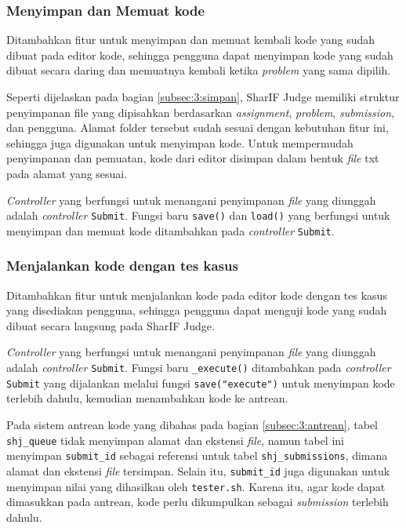 \subsubsection{Menyimpan dan Memuat kode}
Ditambahkan fitur untuk menyimpan dan memuat kembali kode yang sudah dibuat pada editor kode, sehingga pengguna dapat menyimpan kode yang sudah dibuat secara daring dan memuatnya kembali ketika \textit{problem} yang sama dipilih. 

Seperti dijelaskan pada bagian \ref{subsec:3:simpan}, SharIF Judge memiliki struktur penyimpanan file yang dipisahkan berdasarkan \textit{assignment}, \textit{problem}, \textit{submission}, dan pengguna. Alamat folder tersebut sudah sesuai dengan kebutuhan fitur ini, sehingga juga digunakan untuk menyimpan kode. Untuk mempermudah penyimpanan dan pemuatan, kode dari editor disimpan dalam bentuk \textit{file} txt pada alamat yang sesuai. 

\textit{Controller} yang berfungsi untuk menangani penyimpanan \textit{file} yang diunggah adalah \textit{controller} \texttt{Submit}. Fungsi baru \texttt{save()} dan \texttt{load()} yang berfungsi untuk menyimpan dan memuat kode ditambahkan pada \textit{controller} \texttt{Submit}.
    
\subsubsection{Menjalankan kode dengan tes kasus}
Ditambahkan fitur untuk menjalankan kode pada editor kode dengan tes kasus yang disediakan pengguna, sehingga pengguna dapat menguji kode yang sudah dibuat secara langsung pada SharIF Judge. 

 \textit{Controller} yang berfungsi untuk menangani penyimpanan \textit{file} yang diunggah adalah \textit{controller} \texttt{Submit}. Fungsi baru \verb|_execute()| ditambahkan pada \textit{controller} \texttt{Submit} yang dijalankan melalui fungsi \verb|save("execute")| untuk menyimpan kode terlebih dahulu, kemudian menambahkan kode ke antrean.

Pada sistem antrean kode yang dibahas pada bagian \ref{subsec:3:antrean}, tabel \verb|shj_queue| tidak menyimpan alamat dan ekstensi \textit{file}, namun tabel ini menyimpan \verb|submit_id| sebagai referensi untuk tabel \verb|shj_submissions|, dimana alamat dan ekstensi \textit{file} tersimpan. Selain itu, \verb|submit_id| juga digunakan untuk menyimpan nilai yang dihasilkan oleh \verb|tester.sh|. Karena itu, agar kode dapat dimasukkan pada antrean, kode perlu dikumpulkan sebagai \textit{submission} terlebih dahulu. 

